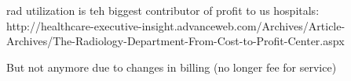  rad utilization is teh biggest contributor of profit to us hospitals:
 http://healthcare-executive-insight.advanceweb.com/Archives/Article-Archives/The-Radiology-Department-From-Cost-to-Profit-Center.aspx
 
 But not anymore due to changes in billing (no longer fee for service)